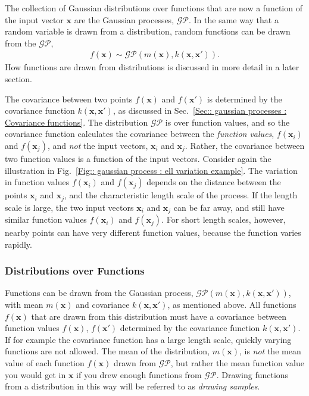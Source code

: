 \documentclass[twoside,english]{uiofysmaster}
\begin{document}
{The collection of Gaussian distributions over functions that are now a function of the input vector $\textbf{x}$ are the Gaussian processes, $\mathcal{GP}$. In the same way that a random variable is drawn from a distribution, random functions can be drawn from the $\mathcal{GP}$,
\begin{align}
f(\textbf{x}) \sim \mathcal{GP}(m(\textbf{x}), k(\textbf{x}, \textbf{x}')).
\end{align}
How functions are drawn from distributions is discussed in more detail in a later section.

The covariance between two points $f(\textbf{x})$ and $f(\textbf{x}')$ is determined by the covariance function $k(\textbf{x}, \textbf{x}')$, as discussed in Sec.~\ref{Sec:: gaussian processes : Covariance functions}. The distribution $\mathcal{GP}$ is over function values, and so the covariance function calculates the covariance between the \textit{function values}, $f(\textbf{x}_i)$ and $f(\textbf{x}_j)$, and \textit{not} the input vectors, $\textbf{x}_i$ and $\textbf{x}_j$. Rather, the covariance between two function values is a function of the input vectors. Consider again the illustration in Fig.~\ref{Fig:: gaussian process : ell variation example}. The variation in function values $f(\textbf{x}_i)$ and $f(\textbf{x}_j)$ depends on the distance between the points $\textbf{x}_i$ and $\textbf{x}_j$, and the characteristic length scale of the process. If the length scale is large, the two input vectors $\textbf{x}_i$ and $\textbf{x}_j$ can be far away, and still have similar function values $f(\textbf{x}_i)$ and $f(\textbf{x}_j)$. For short length scales, however, nearby points can have very different function values, because the function varies rapidly.

\subsubsection{Distributions over Functions}

Functions can be drawn from the Gaussian process, $\mathcal{GP}(m(\textbf{x}), k(\textbf{x}, \textbf{x}'))$, with mean $m(\textbf{x})$ and covariance $k(\textbf{x}, \textbf{x}')$, as mentioned above. All functions $f(\textbf{x})$ that are drawn from this distribution must have a covariance between function values $f(\textbf{x})$, $f(\textbf{x}')$ determined by the covariance function $k(\textbf{x}, \textbf{x}')$. If for example the covariance function has a large length scale, quickly varying functions are not allowed. The mean of the distribution, $m(\textbf{x})$, is \textit{not} the mean value of each function $f(\textbf{x})$ drawn from $\mathcal{GP}$, but rather the mean function value you would get in $\textbf{x}$ if you drew enough functions from $\mathcal{GP}$. Drawing functions from a distribution in this way will be referred to as \textit{drawing samples}.

}
\end{document}
